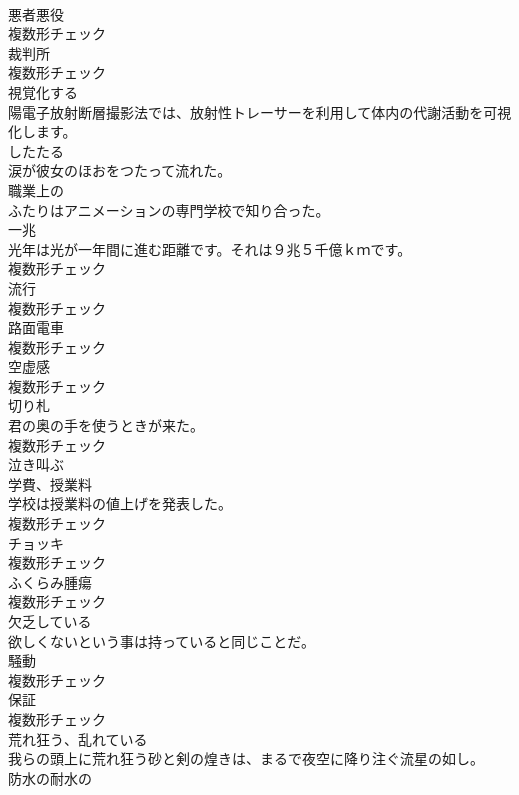 \documentclass[8pt]{extreport}
\begin{document}
\begin{CJK}{UTF8}{min}
\\	[名詞]	悪者悪役	
\\	複数形チェック
\\	[名詞]	裁判所	
\\	複数形チェック
\\	[動詞]	視覚化する	
\\	陽電子放射断層撮影法では、放射性トレーサーを利用して体内の代謝活動を可視化します。	
\\	[動詞]	したたる	
\\	涙が彼女のほおをつたって流れた。	
\\	[形容詞]	職業上の	
\\	ふたりはアニメーションの専門学校で知り合った。	
\\	[名詞]	一兆	
\\	光年は光が一年間に進む距離です。それは９兆５千億ｋｍです。	
\\	複数形チェック
\\	[名詞]	流行	
\\	複数形チェック
\\	[名詞]	路面電車	
\\	複数形チェック
\\	[名詞]	空虚感	
\\	複数形チェック
\\	[名詞]	切り札	
\\	君の奥の手を使うときが来た。	
\\	複数形チェック
\\	[動詞]	泣き叫ぶ	
\\	[名詞]	学費、授業料	
\\	学校は授業料の値上げを発表した。	
\\	複数形チェック
\\	[名詞]	チョッキ	
\\	複数形チェック
\\	[名詞]	ふくらみ腫瘍	
\\	複数形チェック
\\	[形容詞]	欠乏している	
\\	欲しくないという事は持っていると同じことだ。	
\\	[名詞]	騒動	
\\	複数形チェック
\\	[名詞]	保証	
\\	複数形チェック
\\	[形容詞]	荒れ狂う、乱れている	
\\	我らの頭上に荒れ狂う砂と剣の煌きは、まるで夜空に降り注ぐ流星の如し。	
\\	[形容詞]	防水の耐水の	

\end{CJK}
\end{document}
